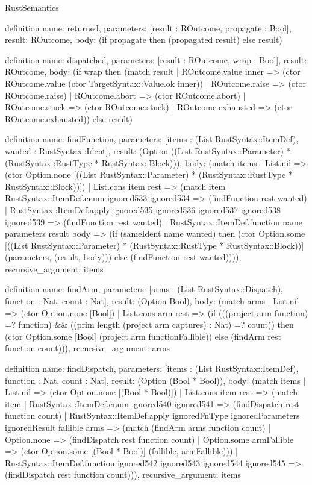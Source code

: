 \begin{lexlean}{RustSemantics}
\begin{semanticmodule}
definition{
  name: returned,
  parameters: [result : ROutcome, propagate : Bool],
  result: ROutcome,
  body: (if propagate then (propagated result) else result)
}

definition{
  name: dispatched,
  parameters: [result : ROutcome, wrap : Bool],
  result: ROutcome,
  body: (if wrap then (match result
    | ROutcome.value inner => (ctor ROutcome.value (ctor TargetSyntax::Value.ok inner))
    | ROutcome.raise => (ctor ROutcome.raise)
    | ROutcome.abort => (ctor ROutcome.abort)
    | ROutcome.stuck => (ctor ROutcome.stuck)
    | ROutcome.exhausted => (ctor ROutcome.exhausted)) else result)
}

definition{
  name: findFunction,
  parameters: [items : (List RustSyntax::ItemDef), wanted : RustSyntax::Ident],
  result: (Option ((List RustSyntax::Parameter) * (RustSyntax::RustType * RustSyntax::Block))),
  body: (match items
    | List.nil => (ctor Option.none [((List RustSyntax::Parameter) * (RustSyntax::RustType * RustSyntax::Block))])
    | List.cons item rest => (match item
      | RustSyntax::ItemDef.enum ignored533 ignored534 => (findFunction rest wanted)
      | RustSyntax::ItemDef.apply ignored535 ignored536 ignored537 ignored538 ignored539 => (findFunction rest wanted)
      | RustSyntax::ItemDef.function name parameters result body => (if (sameIdent name wanted) then (ctor Option.some [((List RustSyntax::Parameter) * (RustSyntax::RustType * RustSyntax::Block))] (parameters, (result, body))) else (findFunction rest wanted)))),
  recursive_argument: items
}

definition{
  name: findArm,
  parameters: [arms : (List RustSyntax::Dispatch), function : Nat, count : Nat],
  result: (Option Bool),
  body: (match arms
    | List.nil => (ctor Option.none [Bool])
    | List.cons arm rest => (if (((project arm function) =? function) && ((prim length (project arm captures) : Nat) =? count)) then (ctor Option.some [Bool] (project arm functionFallible)) else (findArm rest function count))),
  recursive_argument: arms
}

definition{
  name: findDispatch,
  parameters: [items : (List RustSyntax::ItemDef), function : Nat, count : Nat],
  result: (Option (Bool * Bool)),
  body: (match items
    | List.nil => (ctor Option.none [(Bool * Bool)])
    | List.cons item rest => (match item
      | RustSyntax::ItemDef.enum ignored540 ignored541 => (findDispatch rest function count)
      | RustSyntax::ItemDef.apply ignoredFnType ignoredParameters ignoredResult fallible arms => (match (findArm arms function count)
        | Option.none => (findDispatch rest function count)
        | Option.some armFallible => (ctor Option.some [(Bool * Bool)] (fallible, armFallible)))
      | RustSyntax::ItemDef.function ignored542 ignored543 ignored544 ignored545 => (findDispatch rest function count))),
  recursive_argument: items
}


\end{semanticmodule}
\end{lexlean}
